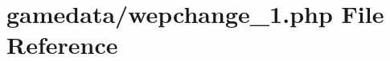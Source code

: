 \hypertarget{wepchange__1_8php}{\section{gamedata/wepchange\+\_\+1.php File Reference}
\label{wepchange__1_8php}
}
